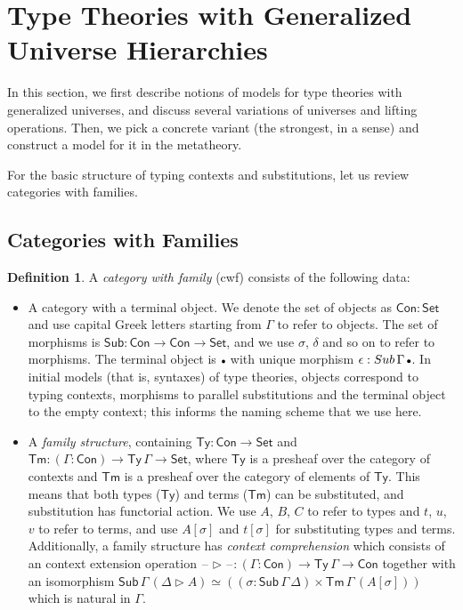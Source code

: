 \documentclass[a4paper,UKenglish,cleveref, autoref, thm-restate]{lipics-v2021}
\theoremstyle{remark}
\theoremstyle{definition}
\newtheorem{mydefinition}{Definition}
\newcommand{\Seti}{\mathsf{Set}}
\newcommand{\Con}{\mathsf{Con}}
\newcommand{\Ty}{\mathsf{Ty}}
\newcommand{\Tm}{\mathsf{Tm}}
\newcommand{\Sub}{\mathsf{Sub}}
\newcommand{\emptycon}{\scaleobj{.75}\bullet}
\newcommand{\ext}{\triangleright}
\newcommand{\blank}{\mathord{\hspace{1pt}\text{--}\hspace{1pt}}}
\begin{document}
\section{Type Theories with Generalized Universe Hierarchies}
\label{sec:ttgu}

In this section, we first describe notions of models for type theories with
generalized universes, and discuss several variations of universes and lifting
operations. Then, we pick a concrete variant (the strongest, in a sense)
and construct a model for it in the metatheory.

For the basic structure of typing contexts and substitutions, let us review
categories with families.

\subsection{Categories with Families}
\label{sec:categories_with_families}

\begin{mydefinition}
A \emph{category with family} (cwf) \cite{Dybjer96internaltype} consists of the following data:
\begin{itemize}
\item A category with a terminal object. We denote the set of objects as $\Con :
  \Seti$ and use capital Greek letters starting from $\Gamma$ to refer to
  objects. The set of morphisms is $\Sub : \Con \to \Con \to \Seti$, and we use
  $\sigma$, $\delta$ and so on to refer to morphisms. The terminal object is
  $\emptycon$ with unique morphism $\epsilon : \Sub\,\Gamma\,\emptycon$. In
  initial models (that is, syntaxes) of type theories, objects correspond to
  typing contexts, morphisms to parallel substitutions and the terminal object to
  the empty context; this informs the naming scheme that we use here.
\item A \emph{family structure}, containing $\Ty : \Con \to \Seti$ and $\Tm :
  (\Gamma : \Con) \to \Ty\,\Gamma \to \Seti$, where $\Ty$ is a presheaf over the
  category of contexts and $\Tm$ is a presheaf over the category of elements of
  $\Ty$. This means that both types ($\Ty$) and terms ($\Tm$) can be
  substituted, and substitution has functorial action. We use $A$, $B$, $C$ to
  refer to types and $t$, $u$, $v$ to refer to terms, and use $A[\sigma]$ and
  $t[\sigma]$ for substituting types and terms. Additionally, a family structure
  has \emph{context comprehension} which consists of an context extension
  operation $\blank\ext\blank : (\Gamma : \Con) \to \Ty\,\Gamma \to \Con$
  together with an isomorphism $\Sub\,\Gamma\,(\Delta\ext A) \simeq ((\sigma :
  \Sub\,\Gamma\,\Delta) \times \Tm\,\Gamma\,(A[\sigma]))$ which is natural in
  $\Gamma$.
\end{itemize}
\end{mydefinition}
\end{document}
